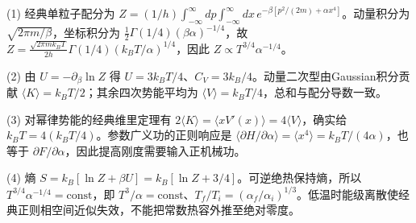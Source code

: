 (1) 经典单粒子配分为 \(Z=(1/h)\int_{-\infty}^{\infty}dp\int_{-\infty}^{\infty}dx\,e^{-\beta[p^2/(2m)+\alpha x^4]}\)。动量积分为 \(\sqrt{2\pi m/\beta}\)，坐标积分为 \(\frac12\Gamma(1/4)(\beta\alpha)^{-1/4}\)，故 \(\boxed{Z=\frac{\sqrt{2\pi m k_BT}}{2h}\Gamma(1/4)(k_BT/\alpha)^{1/4}}\)，因此 \(Z\propto T^{3/4}\alpha^{-1/4}\)。

(2) 由 \(U=-\partial_\beta\ln Z\) 得 \(\boxed{U=3k_BT/4}\)、\(\boxed{C_V=3k_B/4}\)。动量二次型由Gaussian积分贡献 \(\langle K\rangle=k_BT/2\)；其余四次势能平均为 \(\langle V\rangle=k_BT/4\)，总和与配分导数一致。

(3) 对幂律势能的经典维里定理有 \(2\langle K\rangle=\langle xV'(x)\rangle=4\langle V\rangle\)，确实给 \(k_BT=4(k_BT/4)\)。参数广义功的正则响应是 \(\boxed{\langle\partial H/\partial\alpha\rangle=\langle x^4\rangle=k_BT/(4\alpha)}\)，也等于 \(\partial F/\partial\alpha\)，因此提高刚度需要输入正机械功。

(4) 熵 \(S=k_B[\ln Z+\beta U]=k_B[\ln Z+3/4]\)。可逆绝热保持熵，所以 \(T^{3/4}\alpha^{-1/4}=\mathrm{const}\)，即 \(\boxed{T^3/\alpha=\mathrm{const}}\)、\(T_f/T_i=(\alpha_f/\alpha_i)^{1/3}\)。低温时能级离散使经典正则相空间近似失效，不能把常数热容外推至绝对零度。
